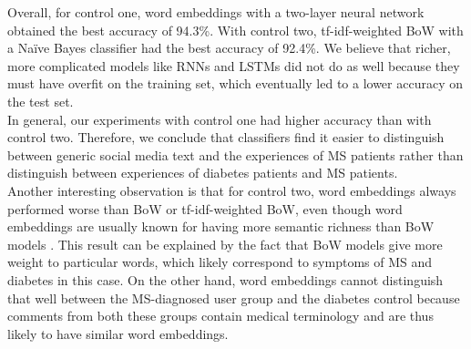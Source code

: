 \documentclass[11pt,a4paper]{article}
\begin{document}
\indent Overall, for control one, word embeddings with a two-layer neural network obtained the best accuracy of 94.3\%. With control two, tf-idf-weighted BoW with a Naïve Bayes classifier had the best accuracy of 92.4\%. We believe that richer, more complicated models like RNNs and LSTMs did not do as well because they must have overfit on the training set, which eventually led to a lower accuracy on the test set. \\
\indent In general, our experiments with control one had higher accuracy than with control two. Therefore, we conclude that classifiers find it easier to distinguish between generic social media text and the experiences of MS patients rather than distinguish between experiences of diabetes patients and MS patients. \\
\indent Another interesting observation is that for control two, word embeddings always performed worse than BoW or tf-idf-weighted BoW, even though word embeddings are usually known for having more semantic richness than BoW models \citep{Mikolav:13}. This result can be explained by the fact that BoW models give more weight to particular words, which likely correspond to symptoms of MS and diabetes in this case. On the other hand, word embeddings cannot distinguish that well between the MS-diagnosed user group and the diabetes control because comments from both these groups contain medical terminology and are thus likely to have similar word embeddings.
\end{document}

